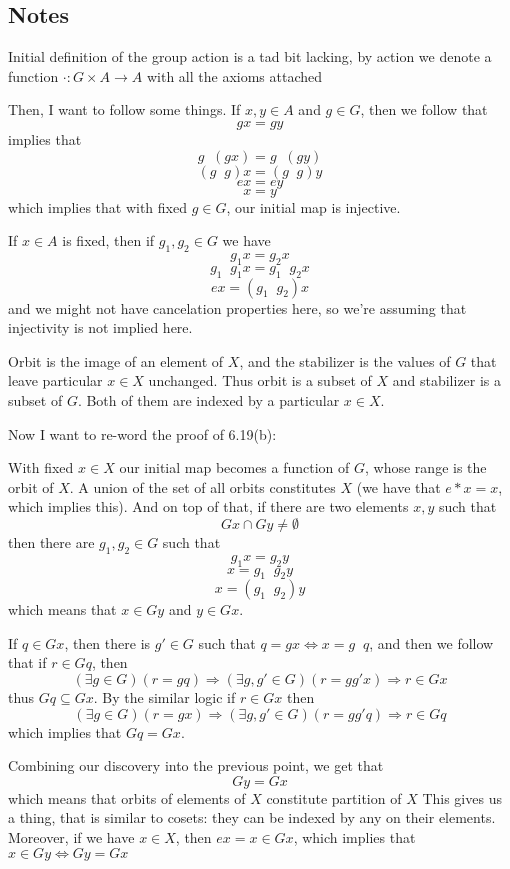 \documentclass[11pt,oneside,titlepage]{book}
\DeclareMathOperator \inv {^{-1}}
\DeclareMathOperator \lra {\Leftrightarrow}
\DeclareMathOperator \ra {\Rightarrow}
\begin{document}
\subsection*{Notes}

Initial definition of the group action is a tad bit lacking, by action
we denote a function $\cdot: G \times A \to A$ with all the axioms
attached

Then, I want to follow some things. If $x, y \in A$ and $g \in G$,
then we follow that
$$gx = gy$$
implies that
$$g\inv (g x) = g\inv (gy)$$
$$(g\inv g) x = (g\inv g)y$$
$$e x = e y$$
$$x = y$$
which implies that with fixed $g \in G$, our initial map is injective.

If $x \in A$ is fixed, then if $g_1, g_2 \in G$ we have
$$g_1 x = g_2 x$$
$$g_1 \inv g_1 x = g_1 \inv g_2 x$$
$$e x = (g_1 \inv g_2) x$$
and we might not have cancelation properties here, so we're assuming
that injectivity is not implied here.

Orbit is the image of an element of $X$, and the stabilizer is
the values of $G$ that leave particular $x \in X$ unchanged. 
Thus orbit is a subset of $X$ and stabilizer is a subset of $G$.
Both of them are indexed by a particular $x \in X$.

Now I want to re-word the proof of 6.19(b):

With fixed $x \in X$ our initial map becomes a function of $G$,
whose range is the orbit of $X$. A union of the set of all orbits
constitutes $X$ (we have that $e * x = x$, which implies this).
And on top of that, if there are two elements $x, y$ such that
$$Gx \cap Gy \neq \emptyset$$
then there are $g_1, g_2 \in G$ such that
$$g_1 x = g_2 y$$
$$ x = g_1 \inv g_2 y$$
$$ x = (g_1 \inv g_2) y$$
which means that $x \in Gy$ and $y \in Gx$.

If $q \in Gx$, then there is $g' \in G$ such that
$q = gx \lra x = g\inv q$, and then we follow that if $r \in Gq$, then
$$(\exists g \in G) (r = gq) \ra (\exists g, g' \in G) (r = gg'x) \ra r \in Gx$$
thus $Gq \subseteq Gx$. By the similar logic if $r \in Gx$ then
$$(\exists g \in G) (r = gx) \ra (\exists g, g' \in G) (r = gg'q) \ra r \in Gq$$
which implies that $Gq = Gx$.

Combining our discovery into the previous point, we get that
$$Gy = Gx$$
which means that orbits of elements of $X$ constitute partition of $X$
This gives us a thing, that is similar to cosets: they can be indexed
by any on their elements. Moreover, if we have $x \in X$, then
$ex = x  \in Gx$, which implies that $x \in Gy \iff Gy = Gx$
\end{document}
